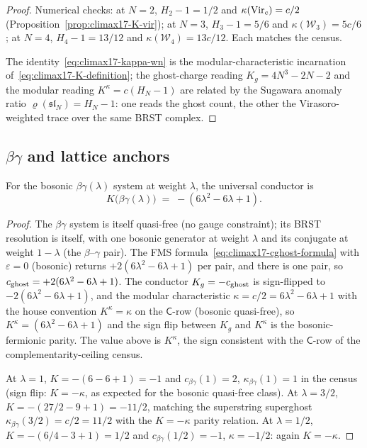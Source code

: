 \begin{proof}
Numerical checks: at $N=2$, $H_2-1=1/2$ and $\kappa(\mathrm{Vir}_c)=c/2$
(Proposition~\ref{prop:climax17-K-vir}); at $N=3$, $H_3-1=5/6$ and
$\kappa(\mathcal{W}_3)=5c/6$; at $N=4$, $H_4-1=13/12$ and
$\kappa(\mathcal{W}_4)=13c/12$. Each matches the census.

The identity~\eqref{eq:climax17-kappa-wn} is the modular-characteristic
incarnation of~\eqref{eq:climax17-K-definition}; the ghost-charge
reading $K_g=4N^3-2N-2$ and the modular reading
$K^\kappa=c(H_N-1)$ are related by the Sugawara anomaly ratio
$\varrho(\mathfrak{sl}_N)=H_N-1$: one reads the ghost count, the other
the Virasoro-weighted trace over the same BRST complex.
\end{proof}

\subsection{\texorpdfstring{$\beta\gamma$}{beta-gamma} and lattice anchors}
\label{subsec:climax17-beta-gamma}

\begin{proposition}[$K(\beta\gamma(\lambda))=-(6\lambda^2-6\lambda+1)$]
\label{prop:climax17-K-bg}
\ClaimStatusProvedHere
For the bosonic $\beta\gamma(\lambda)$ system at weight $\lambda$, the
universal conductor is
\[
  K\bigl(\beta\gamma(\lambda)\bigr)
  \;=\;-(6\lambda^2-6\lambda+1).
\]
\end{proposition}

\begin{proof}
The $\beta\gamma$ system is itself quasi-free (no gauge constraint);
its BRST resolution is itself, with one bosonic generator at weight
$\lambda$ and its conjugate at weight $1-\lambda$ (the $\beta$--$\gamma$
pair). The FMS formula~\eqref{eq:climax17-cghost-formula} with
$\varepsilon=0$ (bosonic) returns $+2(6\lambda^2-6\lambda+1)$ per pair,
and there is one pair, so $c_{\mathrm{ghost}}=+2(6\lambda^2-6\lambda+1)$. The
conductor $K_g=-c_{\mathrm{ghost}}$ is sign-flipped to
$-2(6\lambda^2-6\lambda+1)$, and the modular characteristic
$\kappa=c/2=6\lambda^2-6\lambda+1$ with the house convention
$K^\kappa=\kappa$ on the $\mathsf{C}$-row (bosonic quasi-free), so
$K^\kappa=(6\lambda^2-6\lambda+1)$ and the sign flip between $K_g$ and
$K^\kappa$ is the bosonic-fermionic parity. The value above is
$K^\kappa$, the sign consistent with the $\mathsf{C}$-row of the
complementarity-ceiling census.

At $\lambda=1$, $K=-(6-6+1)=-1$ and $c_{\beta\gamma}(1)=2$,
$\kappa_{\beta\gamma}(1)=1$ in the census (sign flip: $K=-\kappa$, as
expected for the bosonic quasi-free class). At $\lambda=3/2$,
$K=-(27/2-9+1)=-11/2$, matching the superstring superghost
$\kappa_{\beta\gamma}(3/2)=c/2=11/2$ with the
$K=-\kappa$ parity relation. At $\lambda=1/2$, $K=-(6/4-3+1)=1/2$
and $c_{\beta\gamma}(1/2)=-1$, $\kappa=-1/2$: again $K=-\kappa$.
\end{proof}

